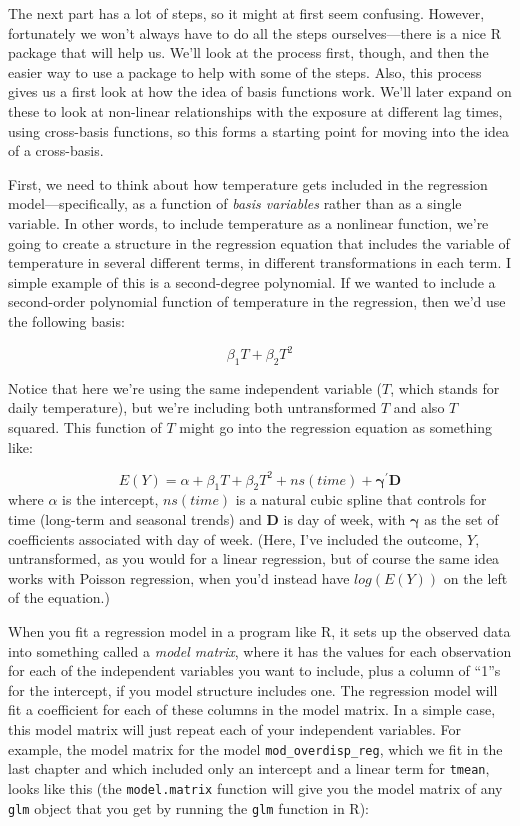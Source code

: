 \documentclass[
]{book}
\begin{document}
The next part has a lot of steps, so it might at first seem confusing. However, fortunately
we won't always have to do all the steps ourselves---there is a nice R package that
will help us. We'll look at the process first, though, and then the easier way to use a
package to help with some of the steps. Also, this process gives us a first look at how
the idea of basis functions work. We'll later expand on these to look at non-linear
relationships with the exposure at different lag times, using cross-basis functions, so this
forms a starting point for moving into the idea of a cross-basis.

First, we need to think about how temperature gets included in the regression
model---specifically, as a function of \emph{basis variables} rather than as a single variable.
In other words, to include temperature as a nonlinear function, we're going to create
a structure in the regression equation that includes the variable of temperature in
several different terms, in different transformations in each term. I simple example of this
is a second-degree polynomial. If we wanted to include a second-order polynomial function
of temperature in the regression, then we'd use the following basis:

\[
\beta_1 T + \beta_2 T^2
\]

Notice that here we're using the same independent variable (\(T\), which stands for daily
temperature), but we're including both untransformed \(T\) and also \(T\) squared. This function
of \(T\) might go into the regression equation as something like:

\[
E(Y) = \alpha + \beta_1 T + \beta_2 T^2 + ns(time) + \mathbf{\gamma^{'}D}
\]
where \(\alpha\) is the intercept, \(ns(time)\) is a natural cubic spline that controls for
time (long-term and seasonal trends) and \(\mathbf{D}\) is day of week, with \(\mathbf{\gamma}\) as
the set of coefficients associated with day of week. (Here, I've included the outcome,
\(Y\), untransformed, as you would for a linear regression, but of course the same idea
works with Poisson regression, when you'd instead have \(log(E(Y))\) on the left of the
equation.)

When you fit a regression model in a program like R, it sets up the observed data into
something called a \emph{model matrix}, where it has the values for each observation for each of
the independent variables you want to include, plus a column of ``1''s for the intercept, if you
model structure includes one. The regression model will fit a coefficient
for each of these columns in the model matrix. In a simple case, this model matrix will just
repeat each of your independent variables. For example, the model matrix for the model
\texttt{mod\_overdisp\_reg}, which we fit in the last chapter and which included only an intercept
and a linear term for \texttt{tmean}, looks like this (the \texttt{model.matrix} function will give you
the model matrix of any \texttt{glm} object that you get by running the \texttt{glm} function in R):
\end{document}
